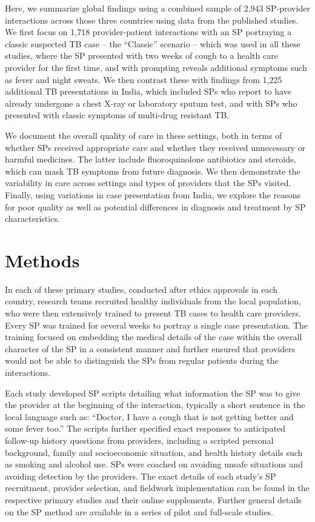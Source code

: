 \documentclass[fleqn,10pt]{wlscirep}
\begin{document}
Here, we summarize global findings using a combined sample of 2,943 SP-provider interactions across those three countries using data from the published studies. We first focus on 1,718 provider-patient interactions with an SP portraying a classic suspected TB case -- the ``Classic'' scenario -- which was used in all these studies, where the SP presented with two weeks of cough to a health care provider for the first time, and with prompting reveals additional symptoms such as fever and night sweats. We then contrast these with findings from 1,225 additional TB presentations in India, which included SPs who report to have already undergone a chest X-ray or laboratory sputum test, and with SPs who presented with classic symptoms of multi-drug resistant TB.

We document the overall quality of care in these settings, both in terms of whether SPs received appropriate care and whether they received unnecessary or harmful medicines. The latter include fluoroquinolone antibiotics and steroids, which can mask TB symptoms from future diagnosis. We then demonstrate the variability in care across settings and types of providers that the SPs visited. Finally, using variations in case presentation from India, we explore the reasons for poor quality as well as potential differences in diagnosis and treatment by SP characteristics.

\section*{Methods}
In each of these primary studies, conducted after ethics approvals in each country, research teams recruited healthy individuals from the local population, who were then extensively trained to present TB cases to health care providers. Every SP was trained for several weeks to portray a single case presentation. The training focused on embedding the medical details of the case within the overall character of the SP in a consistent manner and further ensured that providers would not be able to distinguish the SPs from regular patients during the interactions.

Each study developed SP scripts detailing what information the SP was to give the provider at the beginning of the interaction, typically a short sentence in the local language such as: ``Doctor, I have a cough that is not getting better and some fever too.'' The scripts further specified exact responses to anticipated follow-up history questions from providers, including a scripted personal background, family and socioeconomic situation, and health history details such as smoking and alcohol use. SPs were coached on avoiding unsafe situations and avoiding detection by the providers. The exact details of each study's SP recruitment, provider selection, and fieldwork implementation can be found in the respective primary studies and their online supplements.\cite{daniels2017use,kwan2018variations,sylvia2017tuberculosis} Further general details on the SP method are available in a series of pilot and full-scale studies.\cite{rethans1991method,glassman2000using,das2012urban,satyanarayana2016use,sylvia2014survey} 
\end{document}
